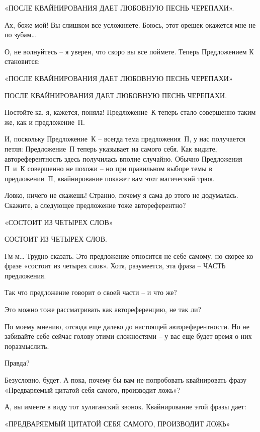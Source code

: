 \documentclass[../main.tex]{subfiles}
\begin{document}
\begin{Dialogue}
«ПОСЛЕ КВАЙНИРОВАНИЯ ДАЕТ ЛЮБОВНУЮ ПЕСНЬ ЧЕРЕПАХИ».

 Ах, боже мой! Вы слишком все усложняете. Боюсь, этот орешек окажется мне не по зубам\ldots{}

 О, не волнуйтесь \--- я уверен, что скоро вы все поймете. Теперь Предложением К становится:

«ПОСЛЕ КВАЙНИРОВАНИЯ ДАЕТ ЛЮБОВНУЮ ПЕСНЬ ЧЕРЕПАХИ»

ПОСЛЕ КВАЙНИРОВАНИЯ ДАЕТ ЛЮБОВНУЮ ПЕСНЬ ЧЕРЕПАХИ.

 Постойте-ка, я, кажется, поняла! Предложение~К теперь стало совершенно таким же, как и предложение~П.

 И, поскольку Предложение~К \--- всегда тема предложения~П, у нас получается петля: Предложение~П теперь указывает на самого себя. Как видите, автореферентность здесь получилась вполне случайно. Обычно Предложения П~и~К совершенно не похожи \--- но при правильном выборе темы в предложении~П, квайнирование покажет вам этот магический трюк.

 Ловко, ничего не скажешь! Странно, почему я сама до этого не додумалась. Скажите, а следующее предложение тоже автореферентно?

«СОСТОИТ ИЗ ЧЕТЫРЕХ СЛОВ»

СОСТОИТ ИЗ ЧЕТЫРЕХ СЛОВ.

 Гм-м\ldots{} Трудно сказать. Это предложение относится не себе самому, но скорее ко фразе «состоит из четырех слов». Хотя, разумеется, эта фраза \--- ЧАСТЬ предложения.

 Так что предложение говорит о своей части \--- и что же?

 Это можно тоже рассматривать как автореференцию, не так ли?

 По моему мнению, отсюда еще далеко до настоящей автореферентности. Но не забивайте себе сейчас голову этими сложностями \--- у вас еще будет время о них поразмыслить.

 Правда?

 Безусловно, будет. А пока, почему бы вам не попробовать квайнировать фразу «Предваряемый цитатой себя самого, производит ложь»?

 А, вы имеете в виду тот хулиганский звонок. Квайнирование этой фразы дает:

«ПРЕДВАРЯЕМЫЙ ЦИТАТОЙ СЕБЯ САМОГО, ПРОИЗВОДИТ ЛОЖЬ»


\end{Dialogue}
\end{document}
